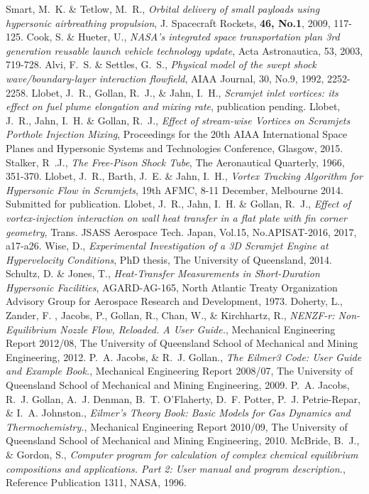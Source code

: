 \documentclass{AIAA}
\begin{document}
\begin{thebibliography}{}
Smart, M.~K. \& Tetlow, M.~R., {\it Orbital delivery of small payloads using hypersonic airbreathing propulsion}, J. Spacecraft Rockets, {\bf 46, No.1}, 2009, 117-125.
Cook, S. \& Hueter, U., {\it NASA's integrated space transportation plan 3rd generation reusable launch vehicle technology update}, Acta Astronautica, 53, 2003, 719-728.
Alvi, F.~S. \& Settles, G.~S., {\it Physical model of the swept shock wave/boundary-layer interaction flowfield}, AIAA Journal, 30, No.9, 1992, 2252-2258.
Llobet, J.~R., Gollan, R.~J., \& Jahn, I.~H., {\it Scramjet inlet vortices: its effect on fuel plume elongation and mixing rate}, publication pending.
Llobet, J.~R., Jahn, I.~H. \& Gollan, R.~J., {\it Effect of stream-wise Vortices on Scramjets Porthole Injection Mixing}, Proceedings for the 20th AIAA International Space Planes and Hypersonic Systems and Technologies Conference, Glasgow, 2015. 
Stalker, R~.J., {\it The Free-Pison Shock Tube}, The Aeronautical Quarterly, 1966, 351-370.
Llobet, J.~R., Barth, J.~E. \& Jahn, I.~H., {\it Vortex Tracking Algorithm for Hypersonic Flow in Scramjets}, 19th AFMC, 8-11 December, Melbourne 2014. Submitted for publication.
Llobet, J.~R., Jahn, I.~H. \& Gollan, R.~J., {\it Effect of vortex-injection interaction on wall heat transfer in a flat plate with fin corner geometry}, Trans. JSASS Aerospace Tech. Japan, Vol.15, No.APISAT-2016, 2017, a17-a26. 
Wise, D., {\it Experimental Investigation of a 3D Scramjet Engine at Hypervelocity Conditions}, PhD thesis, The University of Queensland, 2014.
Schultz, D. \& Jones, T., {\it Heat-Transfer Measurements in Short-Duration Hypersonic Facilities}, AGARD-AG-165, North Atlantic Treaty Organization Advisory Group for Aerospace Research and Development, 1973.
Doherty, L., Zander, F. , Jacobs, P., Gollan, R., Chan, W., \& Kirchhartz, R., {\it NENZF-r: Non-Equilibrium Nozzle Flow, Reloaded. A User Guide.}, Mechanical Engineering Report 2012/08, The University of Queensland School of Mechanical and Mining Engineering, 2012.
P.~A. Jacobs, \& R.~J. Gollan., {\it The Eilmer3 Code: User Guide and Example Book.}, Mechanical Engineering Report 2008/07, The University of Queensland School of Mechanical and Mining Engineering, 2009.
P.~A. Jacobs, R.~J. Gollan, A.~J. Denman, B.~T. O'Flaherty, D.~F. Potter, P.~J. Petrie-Repar, \& I.~A. Johnston., {\it Eilmer's Theory Book: Basic Models for Gas Dynamics and Thermochemistry.}, Mechanical Engineering Report 2010/09, The University of Queensland School of Mechanical and Mining Engineering, 2010.
McBride, B.~J., \& Gordon, S., {\it Computer program for calculation of complex chemical equilibrium	compositions and applications. Part 2: User manual and program description.}, Reference Publication 1311, NASA, 1996.


\end{thebibliography}
\end{document}
